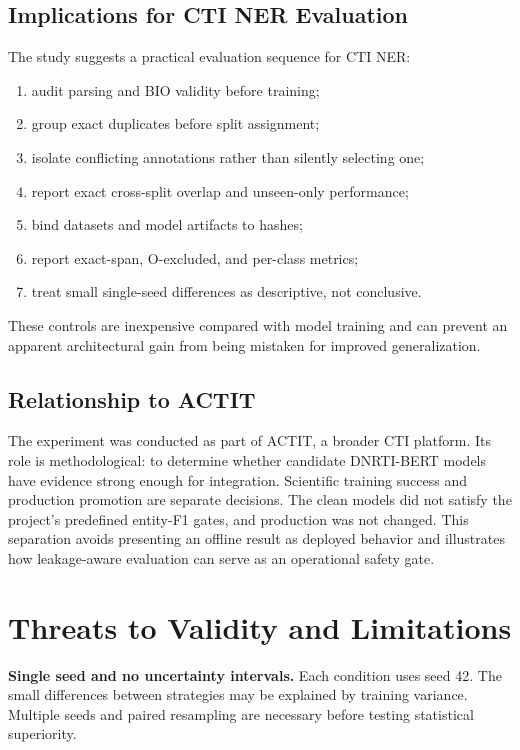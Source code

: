 \documentclass[conference]{IEEEtran}
\begin{document}
\subsection{Implications for CTI NER Evaluation}
The study suggests a practical evaluation sequence for CTI NER:

\begin{enumerate}
    \item audit parsing and BIO validity before training;
    \item group exact duplicates before split assignment;
    \item isolate conflicting annotations rather than silently selecting one;
    \item report exact cross-split overlap and unseen-only performance;
    \item bind datasets and model artifacts to hashes;
    \item report exact-span, O-excluded, and per-class metrics;
    \item treat small single-seed differences as descriptive, not conclusive.
\end{enumerate}

These controls are inexpensive compared with model training and can prevent an apparent architectural gain from being mistaken for improved generalization.

\subsection{Relationship to ACTIT}
The experiment was conducted as part of ACTIT, a broader CTI platform. Its role is methodological: to determine whether candidate DNRTI-BERT models have evidence strong enough for integration. Scientific training success and production promotion are separate decisions. The clean models did not satisfy the project's predefined entity-F1 gates, and production was not changed. This separation avoids presenting an offline result as deployed behavior and illustrates how leakage-aware evaluation can serve as an operational safety gate.

\section{Threats to Validity and Limitations}
\textbf{Single seed and no uncertainty intervals.} Each condition uses seed 42. The small differences between strategies may be explained by training variance. Multiple seeds and paired resampling are necessary before testing statistical superiority.
\end{document}
